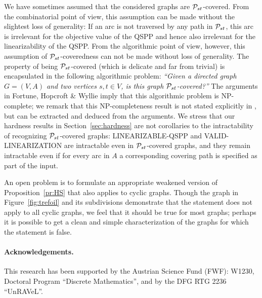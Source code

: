 \documentclass[11pt,fleqn]{article}
\begin{document}
We have sometimes assumed that the considered graphs are ${\cal P}_{st}$-covered.
From the combinatorial point of view, this assumption can be made without the slightest loss 
of generality: If an arc is not traversed by any path in ${\cal P}_{st}$, this arc is irrelevant for 
the objective value of the QSPP and hence also irrelevant for the linearizability of the QSPP.
From the algorithmic point of view, however, this assumption of ${\cal P}_{st}$-coveredness can not be 
made without loss of generality.
The property of being ${\cal P}_{st}$-covered (which is delicate and far from trivial) is encapsulated
in the following algorithmic problem:
\emph{``Given a directed graph $G=(V,A)$ and two vertices $s,t\in V$, is this graph ${\cal P}_{st}$-covered?''}
The arguments in Fortune, Hopcroft \& Wyllie \cite{FoHoWy1980} imply that this algorithmic
problem is NP-complete; we remark that this NP-completeness result is not stated explicitly in
\cite{FoHoWy1980}, but can be extracted and deduced from the arguments.
We stress that our hardness results in Section~\ref{sec:hardness} are not corollaries to the 
intractability of recognizing ${\cal P}_{st}$-covered graphs: LINEARIZABLE-QSPP and VALID-LINEARIZATION 
are intractable even in ${\cal P}_{st}$-covered graphs, and they remain intractable even if for every 
arc in $A$ a corresponding covering path is specified as part of the input.

An open problem is to formulate an appropriate weakened version of Proposition~\ref{pr:HS} 
that also applies to cyclic graphs.
Though the graph in Figure~\ref{fig:trefoil} and its subdivisions demonstrate that the 
statement does not apply to all cyclic graphs, we feel that it should be true for most graphs; 
perhaps it is possible to get a clean and simple characterization of the graphs for which the
statement is false.

\medskip
\paragraph{Acknowledgements.}
This research has been supported 
by the Austrian Science Fund (FWF): W1230, Doctoral Program ``Discrete Mathematics'',
and by the DFG RTG 2236 ``UnRAVeL''.
\end{document}
